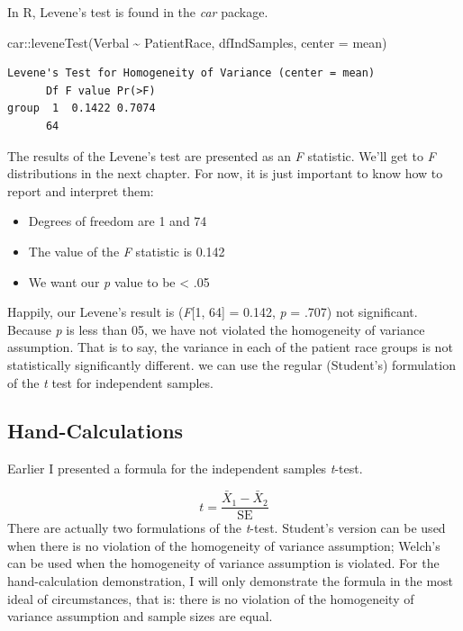 \documentclass[
  11pt,
]{book}
\newenvironment{Shaded}{\begin{snugshade}}{\end{snugshade}}
\newcommand{\AttributeTok}[1]{\textcolor[rgb]{0.77,0.63,0.00}{#1}}
\newcommand{\FunctionTok}[1]{\textcolor[rgb]{0.00,0.00,0.00}{#1}}
\newcommand{\NormalTok}[1]{#1}
\newcommand{\SpecialCharTok}[1]{\textcolor[rgb]{0.00,0.00,0.00}{#1}}
\providecommand{\tightlist}{%
  \setlength{\itemsep}{0pt}\setlength{\parskip}{0pt}}
\begin{document}
In R, Levene's test is found in the \emph{car} package.

\begin{Shaded}
\begin{Highlighting}[]
\NormalTok{car}\SpecialCharTok{::}\FunctionTok{leveneTest}\NormalTok{(Verbal }\SpecialCharTok{\textasciitilde{}}\NormalTok{ PatientRace, dfIndSamples, }\AttributeTok{center =}\NormalTok{ mean)}
\end{Highlighting}
\end{Shaded}

\begin{verbatim}
Levene's Test for Homogeneity of Variance (center = mean)
      Df F value Pr(>F)
group  1  0.1422 0.7074
      64               
\end{verbatim}

The results of the Levene's test are presented as an \emph{F} statistic. We'll get to \emph{F} distributions in the next chapter. For now, it is just important to know how to report and interpret them:

\begin{itemize}
\tightlist
\item
  Degrees of freedom are 1 and 74
\item
  The value of the \emph{F} statistic is 0.142
\item
  We want our \emph{p} value to be \textless{} .05
\end{itemize}

Happily, our Levene's result is (\emph{F}{[}1, 64{]} = 0.142, \emph{p} = .707) not significant. Because \emph{p} is less than 05, we have not violated the homogeneity of variance assumption. That is to say, the variance in each of the patient race groups is not statistically significantly different. we can use the regular (Student's) formulation of the \emph{t} test for independent samples.

\hypertarget{hand-calculations-1}{%
\subsection{Hand-Calculations}\label{hand-calculations-1}}

Earlier I presented a formula for the independent samples \emph{t}-test.

\[t = \frac{\bar{X}_1 - \bar{X}_2}{\mbox{SE}}\]
There are actually two formulations of the \emph{t}-test. Student's version can be used when there is no violation of the homogeneity of variance assumption; Welch's can be used when the homogeneity of variance assumption is violated. For the hand-calculation demonstration, I will only demonstrate the formula in the most ideal of circumstances, that is: there is no violation of the homogeneity of variance assumption and sample sizes are equal.
\end{document}
